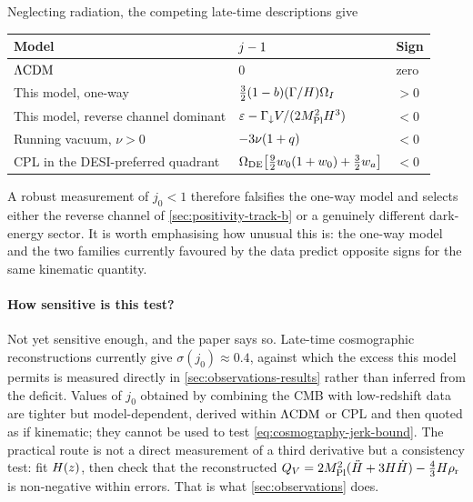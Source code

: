 \begin{theorem}\label{thm:sign-table}
  Neglecting radiation, the competing late-time descriptions give
  \begin{center}
  \begin{tabular}{lll}
    \toprule
    Model & $j-1$ & Sign \\
    \midrule
    $\Lambda\mathrm{CDM}$ & $0$ & zero \\
    This model, one-way & $\tfrac32(1-b)(\Gamma/H)\Omega_I$ & $>0$ \\
    This model, reverse channel dominant
      & $\varepsilon-\Gamma_{\downarrow} V/(2M_{\mathrm{Pl}}^2H^3)$ & $<0$ \\
    Running vacuum, $\nu>0$
      \parencite{shapiro2002_scaling} & $-3\nu(1+q)$ & $<0$ \\
    CPL \parencite{chevallier2001_accelerating,linder2003_exploring}
    in the DESI-preferred quadrant
      & $\Omega_{\rm DE}\!\left[\tfrac92w_0(1+w_0)+\tfrac32w_a\right]$ & $<0$ \\
    \bottomrule
  \end{tabular}
  \end{center}
\end{theorem}

A robust measurement of $j_0<1$ therefore falsifies the one-way model and
selects either the reverse channel of \cref{sec:positivity-track-b} or a
genuinely different dark-energy sector. It is worth emphasising how unusual
this is: the one-way model and the two families currently favoured by the data
predict opposite signs for the same kinematic quantity.

\paragraph{How sensitive is this test?} Not yet sensitive enough, and the paper
says so. Late-time cosmographic reconstructions currently give
$\sigma(j_0)\approx0.4$, against which the excess this model permits is
measured directly in \cref{sec:observations-results} rather than inferred from
the deficit.
Values of $j_0$ obtained by combining the CMB with low-redshift data are
tighter but model-dependent, derived within $\Lambda\mathrm{CDM}$ or CPL and then quoted as
if kinematic; they cannot be used to test
\cref{eq:cosmography-jerk-bound}. The practical route is not a direct
measurement of a third derivative but a consistency test: fit $H(z)$, then
check that the reconstructed
$Q_{V}=2M_{\mathrm{Pl}}^2(\ddot {H}+3H\dot {H})-\tfrac43H\rho_{\mathrm{r}}$ is non-negative
within errors. That is what \cref{sec:observations} does.

